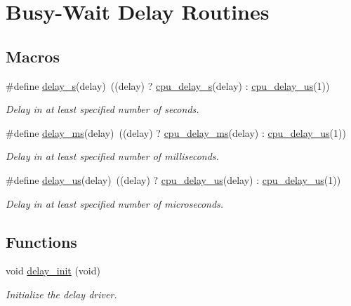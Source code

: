 \hypertarget{group__group__common__services__delay}{}\section{Busy-\/\+Wait Delay Routines}
\label{group__group__common__services__delay}
\subsection*{Macros}
\begin{DoxyCompactItemize}
\item 
\#define \hyperlink{group__group__common__services__delay_gafdccadc6c16847907b3252cdef83e8b0}{delay\+\_\+s}(delay)~((delay) ? \hyperlink{systick__counter_8h_ac16436855dffc7dc7939324a0408adb0}{cpu\+\_\+delay\+\_\+s}(delay) \+: \hyperlink{systick__counter_8h_a25de6f000bcc542a5f3292e369e49681}{cpu\+\_\+delay\+\_\+us}(1))
\begin{DoxyCompactList}\small\item\em Delay in at least specified number of seconds. \end{DoxyCompactList}\item 
\#define \hyperlink{group__group__common__services__delay_gad917a5d772ddbd99ad97a1c999ce40d4}{delay\+\_\+ms}(delay)~((delay) ? \hyperlink{systick__counter_8h_acdbe5e2991f2b665ef2babea7b978667}{cpu\+\_\+delay\+\_\+ms}(delay) \+: \hyperlink{systick__counter_8h_a25de6f000bcc542a5f3292e369e49681}{cpu\+\_\+delay\+\_\+us}(1))
\begin{DoxyCompactList}\small\item\em Delay in at least specified number of milliseconds. \end{DoxyCompactList}\item 
\#define \hyperlink{group__group__common__services__delay_gaf9a0c0e0f880d818a4c2c3ea9fe8cba1}{delay\+\_\+us}(delay)~((delay) ? \hyperlink{systick__counter_8h_a25de6f000bcc542a5f3292e369e49681}{cpu\+\_\+delay\+\_\+us}(delay) \+: \hyperlink{systick__counter_8h_a25de6f000bcc542a5f3292e369e49681}{cpu\+\_\+delay\+\_\+us}(1))
\begin{DoxyCompactList}\small\item\em Delay in at least specified number of microseconds. \end{DoxyCompactList}\end{DoxyCompactItemize}
\subsection*{Functions}
\begin{DoxyCompactItemize}
\item 
void \hyperlink{group__group__common__services__delay_gaf3c040fe31e69be32855715a75e0cda4}{delay\+\_\+init} (void)
\begin{DoxyCompactList}\small\item\em Initialize the delay driver. \end{DoxyCompactList}\end{DoxyCompactItemize}


